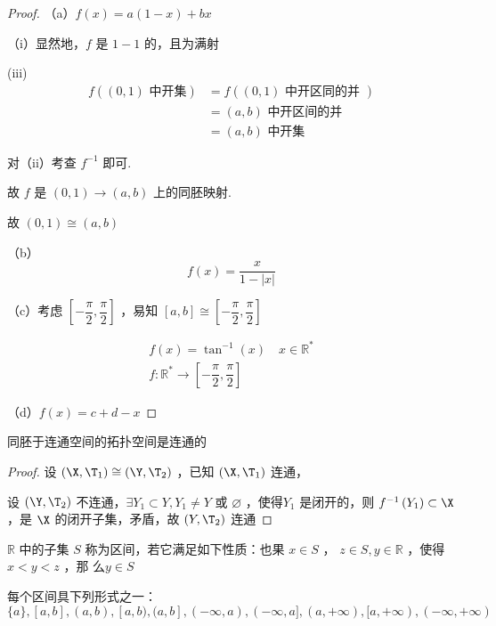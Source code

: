 \begin{proof}
	（a）$f(x)=a(1-x)+b x$
	
	（i）显然地，$f$ 是 $1-1$ 的，且为满射
	
	
	(iii)	$$\begin{aligned}
		f((0,1) \text { 中开集}) & =f((0,1) \text { 中开区同的并 }) \\
		& =(a, b) \text { 中开区间的并 } \\
		& =(a, b) \text { 中开集 }
	\end{aligned}
	$$
	
	
	对（ii）考查 $f^{-1}$ 即可.
	
	故 $f$ 是 $(0,1) \rightarrow(a, b)$ 上的同胚映射.
	
	故 $(0,1) \cong(a, b)$
	
	（b）$$f(x)=\dfrac{x}{1-|x|}$$
	
	（c）考虑 $\left[-\dfrac{\pi}{2}, \dfrac{\pi}{2}\right]$ ，易知 $[a, b] \cong\left[-\dfrac{\pi}{2}, \dfrac{\pi}{2}\right]$
	
	$$
	\begin{gathered}
		f(x)=\tan ^{-1}(x) \quad x \in \mathbb{R}^* \\
		f: \mathbb{R}^* \rightarrow\left[-\dfrac{\pi}{2}, \dfrac{\pi}{2}\right]
	\end{gathered}
	$$
	
	（d）$f(x)=c+d-x$\end{proof}
\begin{theorem}
	同胚于连通空间的拓扑空间是连通的
\end{theorem}
\begin{proof}
	设 $\left(\X, \T_1\right) \cong\left(\Y, \T_2\right)$ ，已知 $\left(\X, \T_1\right)$ 连通，
	
	设 $\left(\Y, \T_2\right)$ 不连通，$\exists Y_1 \subset Y, Y_1 \neq Y$ 或 $\varnothing$ ，使得$Y_1$ 是闭开的，则 $f^{-1}\left(Y_1\right) \subset \X$ ，是 $\X$ 的闭开子集，矛盾，故 $\left(Y, \T_2\right)$ 连通 
\end{proof}

\begin{definition}
	$\mathbb{R}$ 中的子集 $S$ 称为区间，若它满足如下性质：也果 $x \in S$ ， $z \in S, y \in \mathbb{R}$ ，使得$x<y<z$ ，那 么$ y \in S$
\end{definition}

每个区间具下列形式之一：
\[\{a\},[a, b],(a, b),[a, b),(a, b],(-\infty, a),(-\infty, a],(a,+\infty),[a,+\infty),(-\infty,+\infty)\]

